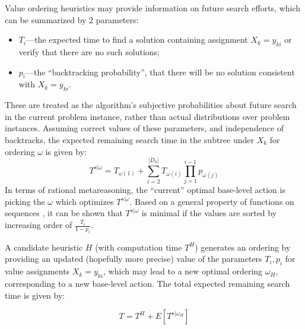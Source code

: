 Value ordering heuristics may provide information on future search
efforts, which can be summarized by 2 parameters:
\begin{itemize}
\item  $T_i$---the expected time to find a solution containing
  assignment  $X_k=y_{ki}$ or verify that there are no such solutions;
\item  $p_i$---the ``backtracking probability'', that there will be no solution
consistent with $X_k=y_{ki}$.
\end{itemize}
These are treated as the algorithm's subjective probabilities about future search
in the current problem instance, rather than actual distributions over problem instances.
Assuming correct values of these parameters, and independence of backtracks,
the expected remaining search time in the subtree under $X_k$ for ordering $\omega$ is given by:
\begin{equation}
\label{eq:expected-search-time}
T^{s|\omega}=T_{\omega(1)}+\sum_{i=2}^{|D_k|}T_{\omega(i)}\prod_{j=1}^{i-1}p_{\omega(j)}
\end{equation}
In terms of rational metareasoning, the ``current'' optimal base-level action is picking
the $\omega $ which optimizes $T^{s|\omega}$.
Based on a general property of functions on sequences \cite{MonmaSidney.sequencing}, it can
be shown that $T^{s|\omega}$ is minimal if 
the values are sorted  by increasing order of $\frac {T_i} {1-p_i}$.

A candidate heuristic $H$ (with computation time $T^H$)  generates
an ordering by providing an updated (hopefully more precise)
value of the parameters $T_i, p_i$ for value assignments
$X_k=y_{ki}$, which may lead to a new optimal ordering $\omega_H$,
corresponding to a new base-level action.  The total expected
remaining search time is given by:

\begin{equation}
\label{eq:net-expected-time}
T=T^H+E[T^{s|\omega_H}]
\end{equation}

